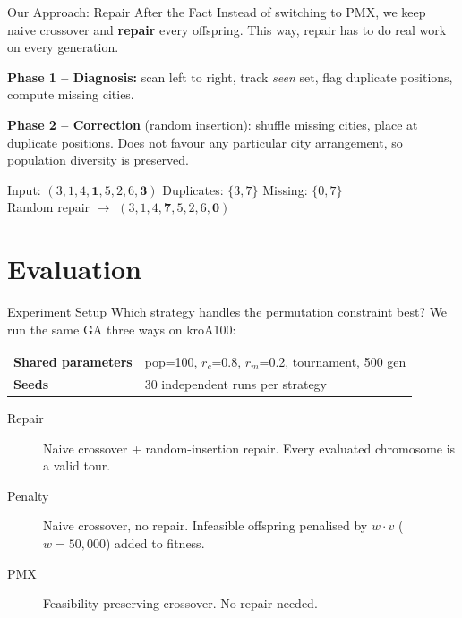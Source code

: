 \documentclass[10pt,aspectratio=169]{beamer}
\begin{document}
\begin{frame}{Our Approach: Repair After the Fact}
Instead of switching to PMX, we keep naive crossover and \textbf{repair}
every offspring. This way, repair has to do real work on every generation.

\medskip

\textbf{Phase 1 -- Diagnosis:} scan left to right, track \emph{seen} set,
flag duplicate positions, compute missing cities.

\medskip

\textbf{Phase 2 -- Correction} (random insertion):
shuffle missing cities, place at duplicate positions. Does not favour
any particular city arrangement, so population diversity is preserved.

\medskip

\begin{example}
Input: $(3,1,4,\mathbf{1},5,2,6,\mathbf{3})$ \quad
Duplicates: $\{3,7\}$ \quad Missing: $\{0,7\}$\\
Random repair $\to$ $(3,1,4,\mathbf{7},5,2,6,\mathbf{0})$ \checkmark
\end{example}
\end{frame}

\section{Evaluation}

\begin{frame}{Experiment Setup}
Which strategy handles the permutation constraint best?
We run the same GA three ways on kroA100:

\bigskip

\begin{tabular}{ll}
\toprule
\textbf{Shared parameters} & pop=100, $r_c$=0.8, $r_m$=0.2, tournament, 500 gen \\
\textbf{Seeds} & 30 independent runs per strategy \\
\bottomrule
\end{tabular}

\bigskip

\begin{description}
    \item[Repair] Naive crossover + random-insertion repair.
          Every evaluated chromosome is a valid tour.
    \item[Penalty] Naive crossover, no repair. Infeasible offspring
          penalised by $w \cdot v$ ($w{=}50{,}000$) added to fitness.
    \item[PMX] Feasibility-preserving crossover. No repair needed.
\end{description}
\end{frame}
\end{document}
